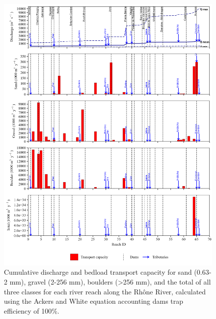 \documentclass[
]{book}
\begin{document}
\begin{figure}
\includegraphics[width=26.24in]{img/res_cascade/res_E3_eA&W/plots_tr_cap-silt/tr_cap_res_sum_hy_E3_eA&W} \caption{Cumulative discharge and bedload transport capacity for sand (0.63-2 mm), gravel (2-256 mm), boulders (>256 mm), and the total of all three classes for each river reach along the Rhône River, calculated using the Ackers and White equation accounting dams trap efficiency of 100\%.}\label{fig:TrcE3eA}
\end{figure}
\end{document}
